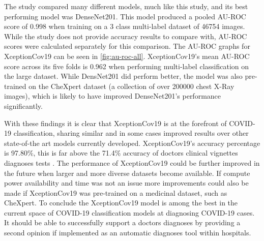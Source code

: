 The \cite{bressem2020comparing} study compared many different models, much like this study, and its best performing model was DenseNet201. This model produced a pooled AU-ROC score of 0.998 when training on a 3 class multi-label dataset of 46754 images. While the study does not provide accuracy results to compare with, AU-ROC scores were calculated separately for this comparison. The AU-ROC graphs for XceptionCov19 can be seen in \autoref{fig:au-roc-all}. XceptionCov19's mean AU-ROC score across its five folds is 0.962 when performing multi-label classification on the large dataset. While \cite{bressem2020comparing} DensNet201 did perform better, the model was also pre-trained on the CheXpert dataset (a collection of over 200000 chest X-Ray images), which is likely to have improved DenseNet201's performance significantly.

With these findings it is clear that XceptionCov19 is at the forefront of COVID-19 classification, sharing similar and in some cases improved results over other state-of-the art models currently developed. XceptionCov19's accuracy percentage is 97.80\%, this is far above the 71.4\% accuracy of doctors clinical vignettes diagnoses tests \citep{richens2020improving}. The performance of XceptionCov19 could be further improved in the future when larger and more diverse datasets become available. If compute power availability and time was not an issue more improvements could also be made if XceptionCov19 was pre-trained on a medicinal dataset, such as CheXpert. To conclude the XceptionCov19 model is among the best in the current space of COVID-19 classification models at diagnosing COVID-19 cases. It should be able to successfully support a doctors diagnoses by providing a second opinion if implemented as an automatic diagnoses tool within hospitals.